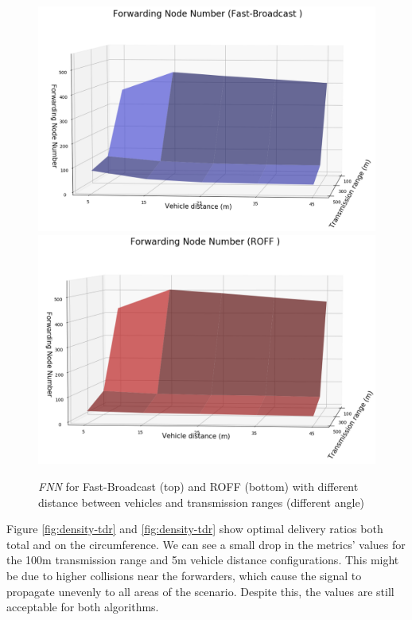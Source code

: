 		\begin{figure}[H]
			\centering
			\includegraphics[width=1.0\textwidth]{immagini/density/fb/fnn-2}
			\includegraphics[width=1.0\textwidth]{immagini/density/roff/fnn-2}
			\caption{\textit{FNN} for Fast-Broadcast (top) and ROFF (bottom) with different distance between vehicles and transmission ranges (different angle)}
			\label{fig:density-fnn-2}
		\end{figure}
	
		Figure \ref{fig:density-tdr} and \ref{fig:density-tdr} show optimal delivery ratios both total and on the circumference. We can see a small drop in the metrics' values for the 100m transmission range and 5m vehicle distance configurations. This might be due to higher collisions near the forwarders, which cause the signal to propagate unevenly to all areas of the scenario. Despite this, the values are still acceptable for both algorithms.
		
